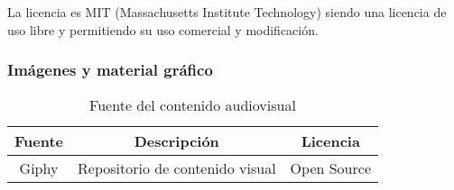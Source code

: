 La licencia es MIT (Massachusetts Institute Technology) siendo una licencia de uso libre y permitiendo su uso comercial y modificación.

\subsubsection{Imágenes y material gráfico}

\begin{table}[H]
	\begin{center}
		\begin{tabular}{ccc}
			\hline
			Fuente                        & Descripción & Licencia  	\\ \hline
			Giphy					    & Repositorio de contenido visual  & Open Source   		\\

		\end{tabular}
		\caption{Fuente del contenido audiovisual}
		\label{table:fuenteimagenes}
	\end{center}
\end{table}
